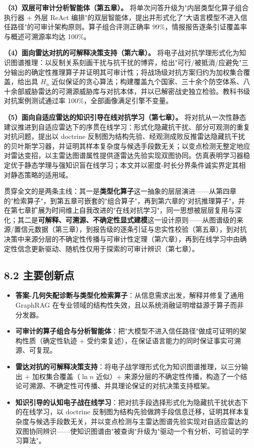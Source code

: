 \documentclass[12pt,a4paper]{ctexart}
\begin{document}
\textbf{（3）双层可审计分析智能体（第五章）。} 将单次问答升级为"内层类型化算子组合执行器 + 外层 ReAct 编排"的双层智能体，提出并形式化了"大语言模型不进入信任路径"的可审计架构原则。算子组合评测正确率 99\%，情报报告逐条引证覆盖率与概述可溯源率均达 100\%。

\textbf{（4）面向雷达对抗的可解释决策支持（第六章）。} 将电子战对抗学理形式化为知识图谱推理：以反制关系刻画干扰与抗干扰的博弈，给出"可行/被抵消/应避免"三分输出的确定性推理算子并证明其可审计性；将战场级对抗方案归约为加权集合覆盖，给出具 $H_n$ 近似保证的贪心算法；构建覆盖九个国家、三十余个防空体系、八十余部威胁雷达的可溯源威胁库与对抗本体，并以已解密战史独立检验。教科书级对抗案例测试通过率 100\%，全部画像满足引擎不变量。

\textbf{（5）面向自适应雷达的知识引导在线对抗学习（第七章）。} 将对抗从一次性静态建议推进到自适应雷达下的序贯在线学习：形式化隐藏抗干扰、部分可观测的重复对抗问题，提出以 doctrine 反制图为结构先验、经观测成败反推雷达隐藏抗干扰的贝叶斯学习器，并证明其样本复杂度与候选手段数无关；以变点检测无整定地应对雷达变招，以主雷达图谱属性提供逐雷达先验实现双图协同。仿真表明学习器稳定优于静态学理与强知识盲在线学习；本文并以密度-时长分界条件诚实界定其相对静态策略的适用域。

贯穿全文的是两条主线：其一是\textbf{类型化算子}这一抽象的层层演进——从第四章的"检索算子"，到第五章可嵌套的"组合算子"，再到第六章的"对抗推理算子"，并在第七章扩展为时间维上自我改进的"在线对抗学习"，同一思想被层层复用与深化；其二是\textbf{可解释、可溯源、不确定性显式建模}这一设计原则——从图谱级的来源/置信元数据（第三章），到报告级的逐条引证与忠实性校验（第五章），到对抗决策中来源分层的不确定性传播与可审计性定理（第六章），再到在线学习中由确定性信念更新驱动、随机性仅用于探索的可审计辨识（第七章）。

\subsection*{8.2 主要创新点}

\begin{itemize}[leftmargin=2em]
\item \textbf{答案-几何失配诊断与类型化检索算子}：从信息需求出发，解释并修复了通用 GraphRAG 在专业领域的结构性失效，且以系统消融证明增益源于算子而非分发器。
\item \textbf{可审计的算子组合与分析智能体}：把"大模型不进入信任路径"做成可证明的架构性质（确定性轨迹 + 受约束复述），在保证语言能力的同时保证事实可溯源、可复现。
\item \textbf{雷达对抗的可解释决策支持}：将电子战学理形式化为知识图谱推理，以三分输出 + 加权集合覆盖（$\ln n$ 近似）+ 来源分层的不确定性传播，构造了一个结论可溯源、不确定性可传播、并具理论保证的对抗决策支持框架。
\item \textbf{知识引导的认知电子战在线学习}：把对抗手段选择形式化为隐藏抗干扰状态下的在线学习，以 doctrine 反制图为结构先验做跨手段信息迁移，证明其样本复杂度与候选手段数无关，并以变点检测与主雷达图谱先验实现对自适应雷达的双图协同辨识——使知识图谱由"被查询"升级为"驱动一个有分析、可验证的学习算法"。
\end{itemize}
\end{document}
